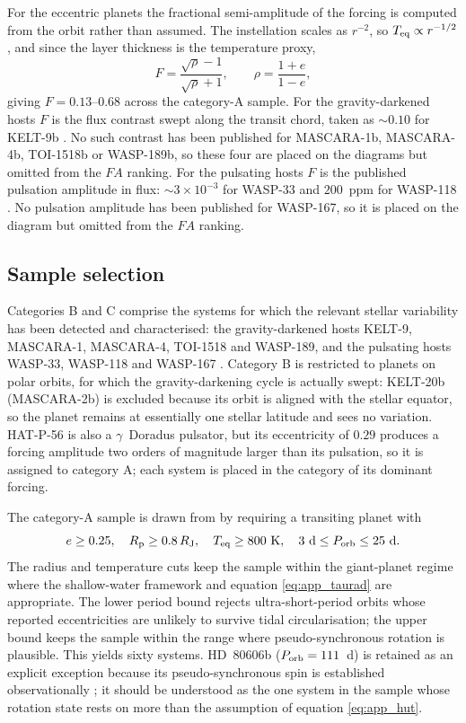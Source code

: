 \documentclass[trackchanges,twocolumn]{aastex7}
\begin{document}
For the eccentric planets the fractional semi-amplitude of the forcing is computed from the orbit rather than assumed. The instellation scales as $r^{-2}$, so $T_{\rm eq}\propto r^{-1/2}$, and since the layer thickness is the temperature proxy,
\begin{equation}
    F = \frac{\sqrt{\rho}-1}{\sqrt{\rho}+1}, \qquad
    \rho = \frac{1+e}{1-e},
    \label{eq:app_F}
\end{equation}
giving $F = 0.13$--$0.68$ across the category-A sample. For the gravity-darkened hosts $F$ is the flux contrast swept along the transit chord, taken as ${\sim}0.10$ for KELT-9b \citep{Jones2022}. No such contrast has been published for MASCARA-1b, MASCARA-4b, TOI-1518b or WASP-189b, so these four are placed on the diagrams but omitted from the $FA$ ranking. For the pulsating hosts $F$ is the published pulsation amplitude in flux: ${\sim}3\times10^{-3}$ for WASP-33 \citep{vonEssen2020} and $200$~ppm for WASP-118 \citep{Temple2017}. No pulsation amplitude has been published for WASP-167, so it is placed on the diagram but omitted from the $FA$ ranking.

\subsection{Sample selection}

Categories B and C comprise the systems for which the relevant stellar variability has been detected and characterised: the gravity-darkened hosts KELT-9, MASCARA-1, MASCARA-4, TOI-1518 and WASP-189, and the pulsating hosts WASP-33, WASP-118 and WASP-167 \citep{Temple2017}. Category B is restricted to planets on polar orbits, for which the gravity-darkening cycle is actually swept: KELT-20b (MASCARA-2b) is excluded because its orbit is aligned with the stellar equator, so the planet remains at essentially one stellar latitude and sees no variation. HAT-P-56 is also a $\gamma$~Doradus pulsator, but its eccentricity of $0.29$ produces a forcing amplitude two orders of magnitude larger than its pulsation, so it is assigned to category A; each system is placed in the category of its dominant forcing.

The category-A sample is drawn from \cite{NEA2026} by requiring a transiting planet with
\begin{equation}
    e \geq 0.25,\quad R_{\rm p} \geq 0.8\,R_{\rm J},\quad T_{\rm eq} \geq 800~\mathrm{K},\quad
    3~\mathrm{d} \leq P_{\rm orb} \leq 25~\mathrm{d}.
\end{equation}
The radius and temperature cuts keep the sample within the giant-planet regime where the shallow-water framework and equation \eqref{eq:app_taurad} are appropriate. The lower period bound rejects ultra-short-period orbits whose reported eccentricities are unlikely to survive tidal circularisation; the upper bound keeps the sample within the range where pseudo-synchronous rotation is plausible. This yields sixty systems. HD~80606b ($P_{\rm orb} = 111$~d) is retained as an explicit exception because its pseudo-synchronous spin is established observationally \citep{LangtonLaughlin2008}; it should be understood as the one system in the sample whose rotation state rests on more than the assumption of equation \eqref{eq:app_hut}.
\end{document}
